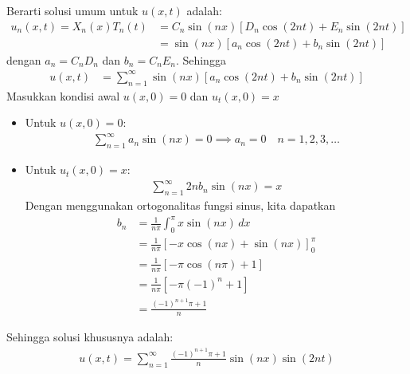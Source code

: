 \documentclass{article}
\theoremstyle{definition}
\begin{document}
\begin{enumerate}
Berarti solusi umum untuk $u(x,t)$ adalah:
\begin{align*}
  u_n(x,t) = X_n(x) T_n(t) &= C_n \sin(n x) \left[ D_n \cos(2n t) + E_n \sin(2n t) \right]\\
  &= \sin(n x) \left[ a_n \cos(2n t) + b_n \sin(2n t) \right]
\end{align*}
dengan $a_n = C_n D_n$ dan $b_n = C_n E_n$. Sehingga
\begin{align*}
  u(x,t) &= \sum_{n=1}^\infty \sin(n x) \left[ a_n \cos(2n t) + b_n \sin(2n t) \right]
\end{align*}
Masukkan kondisi awal $u(x,0) = 0$ dan $u_t(x,0) = x$
\begin{itemize}
  \item Untuk $u(x,0) = 0$:
\begin{align*}
  \sum_{n=1}^\infty a_n \sin(n x) = 0 \implies a_n = 0 \quad n=1,2,3,\ldots
\end{align*}
  \item Untuk $u_t(x,0) = x$:
\begin{align*}
  \sum_{n=1}^\infty 2n b_n \sin(n x) = x
\end{align*}
Dengan menggunakan ortogonalitas fungsi sinus, kita dapatkan
\begin{align*}
  b_n &= \frac{1}{n\pi} \int^\pi_0 x \sin(n x) \,dx\\
  &= \frac{1}{n\pi} \left[ -x \cos(n x) + \sin(nx)\right]_0^\pi \\
  &= \frac{1}{n\pi} \left[ -\pi \cos(n \pi) + 1 \right] \\
  &= \frac{1}{n\pi} \left[ -\pi (-1)^n +1\right] \\
  &= \frac{(-1)^{n+1}\pi +1}{n}
\end{align*}
\end{itemize}
Sehingga solusi khususnya adalah:
\begin{align*}
  u(x,t) = \sum_{n=1}^\infty \frac{(-1)^{n+1}\pi +1}{n}\sin(n x)\sin(2n t)
\end{align*}

\end{enumerate}
\end{document}
